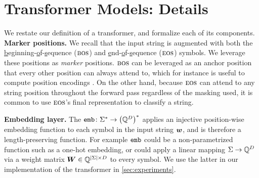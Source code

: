 \documentclass{article}
\let\realaddcontentsline\addcontentsline
\begin{document}

\newpage

\section{Transformer Models: Details}\label{app:extendedbackground}
We restate our definition of a transformer, and formalize each of its components.
\ahatdef*
\textbf{Marker positions.}
We recall that the input string is augmented with both the \underline{b}eginning-\underline{o}f-\underline{s}equence (${{\textsc{bos}}}$) and \underline{e}nd-\underline{o}f-\underline{s}equence (${{\textsc{eos}}}$) symbols.
We leverage these positions as \emph{marker} positions.
${{\textsc{bos}}}$ can be leveraged as an anchor position 
that every other position can always attend to, which for instance is useful to compute position encodings \citep{merrill2024expressivepowertransformerschain}.
On the other hand, because ${{\textsc{eos}}}$ can attend to any string position throughout the forward pass regardless of the masking used, it is common to use ${{\textsc{eos}}}$'s final representation to classify a string.

\textbf{Embedding layer.}
The  $\embedFunc \colon \kleene{\alphabet} \to \kleene{\mleft(\Q^\hiddDim\mright)}$ applies an injective position-wise embedding function to each symbol in the input string ${{\boldsymbol{w}}}$, and is therefore a length-preserving function.
For example ${\texttt{emb}}$ could be a non-parametrized function such as a one-hot embedding, or could apply a linear mapping ${{ \Sigma}} \to {{ \mathbb{Q}}}^{{ D}}$ via a weight matrix ${{{ \bm{W}}}}\in{{ \mathbb{Q}}}^{|{{ \Sigma}}|\times{{ D}}}$ to every symbol.
We use the latter in our implementation of the transformer in \cref{sec:experiments}.
\end{document}
